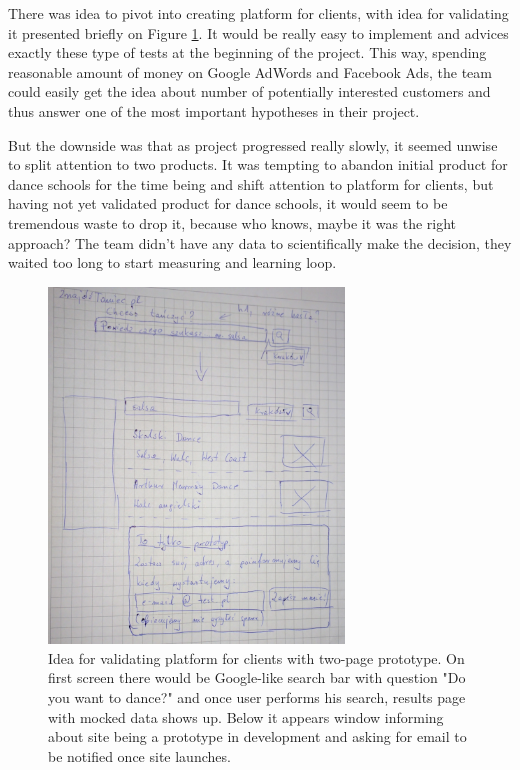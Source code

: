 \documentclass{article}
\begin{document}
There was idea to pivot into creating platform for clients, with idea for validating it presented briefly on Figure \ref{fig:znajdz-taniec}. It would be really easy to implement and \cite{klein2013ux} advices exactly these type of tests at the beginning of the project. This way, spending reasonable amount of money on Google AdWords and Facebook Ads, the team could easily get the idea about number of potentially interested customers and thus answer one of the most important hypotheses in their project.

But the downside was that as project progressed really slowly, it seemed unwise to split attention to two products. It was tempting to abandon initial product for dance schools for the time being and shift attention to platform for clients, but having not yet validated product for dance schools, it would seem to be tremendous waste to drop it, because who knows, maybe it was the right approach? The team didn't have any data to scientifically make the decision, they waited too long to start measuring and learning loop.

\begin{figure}[h]
    \centering
    \includegraphics[width=0.7\textwidth]{znajdz-taniec}
    \caption{Idea for validating platform for clients with two-page prototype. On first screen there would be Google-like search bar with question "Do you want to dance?" and once user performs his search, results page with mocked data shows up. Below it appears window informing about site being a prototype in development and asking for email to be notified once site launches.}
    \label{fig:znajdz-taniec} 
\end{figure}
\end{document}
